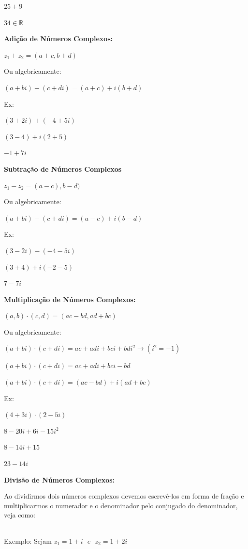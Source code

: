 \begin{multicols*}{2}
	$ 25 + 9 $
			
	$ 34 \in \mathbb{R}$
			
	\textbf{Adição de Números Complexos:}
	
	$ z_1 + z_2 = ( a + c, b + d)$
	
	Ou algebricamente:
	
	$(a + bi) + (c + di) = (a + c) + i(b + d)$
	
	Ex:
	
	$(3 + 2i) + (-4 + 5i)$
	
	$(3 - 4) + i(2 + 5)$
			
	$ -1 + 7i$
			
	\textbf{Subtração de Números Complexos}
	
	$z_1 - z_2 = (a -c), b -d)$
	
	Ou algebricamente:
	
	$(a + bi) - (c + di) = (a - c) + i(b - d)$
	
	Ex:
	
	$(3 - 2i) - (-4 - 5i)$
	
	$(3 + 4) + i(-2 - 5)$
			
	$ 7 - 7i$
	
	\textbf{Multiplicação de Números Complexos:}
	
	$ (a, b) \cdot (c, d) = (ac - bd, ad + bc) $
	
	Ou algebricamente:
	
	$ (a + bi) \cdot (c + di) = ac +adi + bci +bdi^2 \longrightarrow (i^2 = -1) $
	
	$ (a + bi) \cdot (c + di) = ac + adi +bci - bd $
	
	$ (a +bi) \cdot (c + di) = (ac - bd) + i(ad + bc) $
	
	Ex:
	
	$ (4 + 3i) \cdot (2 - 5i) $
	
	$ 8 -20i + 6i - 15i^2 $
	
	$ 8 - 14i + 15 $
	
	$ 23 - 14i $
	
	\textbf{Divisão de Números Complexos:}
	
	Ao dividirmos dois números complexos devemos escrevê-los em forma de fração e multiplicarmos o numerador e o denominador pelo conjugado do denominador, veja como:
	
	\\
	
	Exemplo: Sejam $ z_1 = 1 + i  \ \ \  e \ \ \  z_2 = 1 +2i $
	

\end{multicols*}
